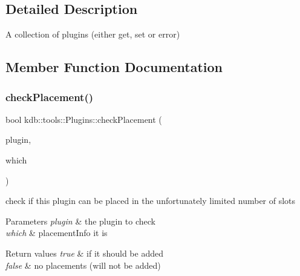 \subsection{Detailed Description}
A collection of plugins (either get, set or error) 

\subsection{Member Function Documentation}
\mbox{\label{classkdb_1_1tools_1_1Plugins_ad2e5c69bacc5dcad0f8a8dd6ef5893f7}} 
\subsubsection{\texorpdfstring{check\+Placement()}{checkPlacement()}}
{\footnotesize\ttfamily bool kdb\+::tools\+::\+Plugins\+::check\+Placement (\begin{DoxyParamCaption}\item[{\hyperlink{classkdb_1_1tools_1_1Plugin}{Plugin} \&}]{plugin,  }\item[{std\+::string}]{which }\end{DoxyParamCaption})}



check if this plugin can be placed in the unfortunately limited number of slots 


\begin{DoxyParams}{Parameters}
{\em plugin} & the plugin to check \\
\hline
{\em which} & placement\+Info it is\\
\hline
\end{DoxyParams}

\begin{DoxyRetVals}{Return values}
{\em true} & if it should be added \\
\hline
{\em false} & no placements (will not be added) \\
\hline
\end{DoxyRetVals}
\mbox{\label{classkdb_1_1tools_1_1Plugins_a00b1abdf673cdfa24677c39b8e740981}} 
